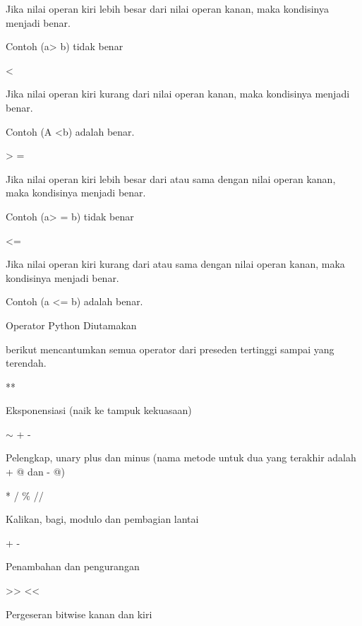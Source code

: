 \noindent
Jika nilai operan kiri lebih besar dari nilai operan kanan, maka kondisinya menjadi benar. \par
\noindent
Contoh (a> b) tidak benar \par
\vspace{12pt}
\noindent
< \par
\noindent
Jika nilai operan kiri kurang dari nilai operan kanan, maka kondisinya menjadi benar. \par
\noindent
Contoh (A <b) adalah benar. \par
\vspace{12pt}
\noindent
> = \par
\noindent
Jika nilai operan kiri lebih besar dari atau sama dengan nilai operan kanan, maka kondisinya menjadi benar. \par
\noindent
Contoh (a> = b) tidak benar \par
\vspace{12pt}
\noindent
<= \par
\noindent
Jika nilai operan kiri kurang dari atau sama dengan nilai operan kanan, maka kondisinya menjadi benar. \par
\noindent
Contoh (a <= b) adalah benar. \par
\noindent
Operator Python Diutamakan \par
\vspace{12pt}
\noindent
 berikut mencantumkan semua operator dari preseden tertinggi sampai yang terendah. \par
\vspace{12pt}
\noindent
** \par
\noindent
Eksponensiasi (naik ke tampuk kekuasaan) \par
\vspace{12pt}
\noindent
 $  \sim  $ + - \par
\noindent
Pelengkap, unary plus dan minus (nama metode untuk dua yang terakhir adalah + @ dan - @) \par
\vspace{12pt}
\noindent
* / $  \%  $ // \par
\noindent
Kalikan, bagi, modulo dan pembagian lantai \par
\vspace{12pt}
\noindent
+ - \par
\noindent
Penambahan dan pengurangan \par
\vspace{12pt}
\noindent
>> << \par
\noindent
Pergeseran bitwise kanan dan kiri \par
